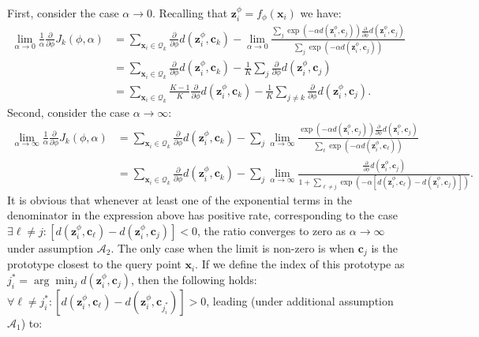 \documentclass{article}
\renewcommand{\vec}[1]{\mathbf{#1}}
\newcommand{\query}[1]{\mathcal{Q}_{#1}}
\newcommand{\metric}{d}
\begin{document}
First, consider the case $\alpha \to 0$. Recalling that $\vec{z}_i^{\phi} = f_{\phi}(\vec{x}_i)$ we have:
\begin{align} %
    \lim_{\alpha \to 0} \frac{1}{\alpha}\frac{\partial}{\partial\phi}J_k(\phi,\alpha) &= \sum_{\vec{x}_i \in \query{k}} \frac{\partial}{\partial\phi} \metric(\vec{z}_i^{\phi}, \vec{c}_k)  - \lim_{\alpha \to 0} \frac{\sum_{j} \exp(-\alpha \metric(\vec{z}_i^{\phi}, \vec{c}_j)) \frac{\partial}{\partial\phi} \metric(\vec{z}_i^{\phi}, \vec{c}_j)}{\sum_{j} \exp(-\alpha \metric(\vec{z}_i^{\phi}, \vec{c}_j))} \nonumber \\
    &= \sum_{\vec{x}_i \in \query{k}} \frac{\partial}{\partial\phi} \metric(\vec{z}_i^{\phi}, \vec{c}_k)  - \frac{1}{K} \sum_{j} \frac{\partial}{\partial\phi} \metric(\vec{z}_i^{\phi}, \vec{c}_j) \nonumber \\
    &= \sum_{\vec{x}_i \in \query{k}} \frac{K-1}{K} \frac{\partial}{\partial\phi} \metric(\vec{z}_i^{\phi}, \vec{c}_k)  - \frac{1}{K} \sum_{j \neq k} \frac{\partial}{\partial\phi} \metric(\vec{z}_i^{\phi}, \vec{c}_j). \nonumber
\end{align}
Second, consider the case  $\alpha \to \infty$:
\begin{align} %
    \lim_{\alpha \to \infty} \frac{1}{\alpha}\frac{\partial}{\partial\phi}J_k(\phi,\alpha) &= \sum_{\vec{x}_i \in \query{k}} \frac{\partial}{\partial\phi} \metric(\vec{z}_i^{\phi}, \vec{c}_k)  - \sum_{j} \lim_{\alpha \to \infty} \frac{\exp(-\alpha \metric(\vec{z}_i^{\phi}, \vec{c}_j)) \frac{\partial}{\partial\phi} \metric(\vec{z}_i^{\phi}, \vec{c}_j)}{\sum_{\ell} \exp(-\alpha \metric(\vec{z}_i^{\phi}, \vec{c}_\ell))} \nonumber \\
    &= \sum_{\vec{x}_i \in \query{k}} \frac{\partial}{\partial\phi} \metric(\vec{z}_i^{\phi}, \vec{c}_k)  - \sum_{j} \lim_{\alpha \to \infty} \frac{\frac{\partial}{\partial\phi} \metric(\vec{z}_i^{\phi}, \vec{c}_j)}{1 + \sum_{\ell \neq j}  \exp(-\alpha [\metric(\vec{z}_i^{\phi}, \vec{c}_\ell) - \metric(\vec{z}_i^{\phi}, \vec{c}_j)])}. \nonumber
\end{align}
It is obvious that whenever at least one of the exponential terms in the denominator in the expression above has positive rate, corresponding to the case $\exists \ell\neq j:  [\metric(\vec{z}_i^{\phi}, \vec{c}_\ell) - \metric(\vec{z}_i^{\phi}, \vec{c}_j)] < 0$, the ratio converges to zero as  $\alpha \to \infty$ under assumption $\mathcal{A}_2$. The only case when the limit is non-zero is when $\vec{c}_j$ is the prototype closest to the query point $\vec{x}_i$. If we define the index of this prototype as $j_{i}^* = \arg\min_j \metric(\vec{z}_i^{\phi}, \vec{c}_j)$, then the following holds: $\forall \ell\neq j_{i}^*:  [\metric(\vec{z}_i^{\phi}, \vec{c}_\ell) - \metric(\vec{z}_i^{\phi}, \vec{c}_{j_{i}^*})] > 0$, leading (under additional assumption $\mathcal{A}_1$) to:
\end{document}
